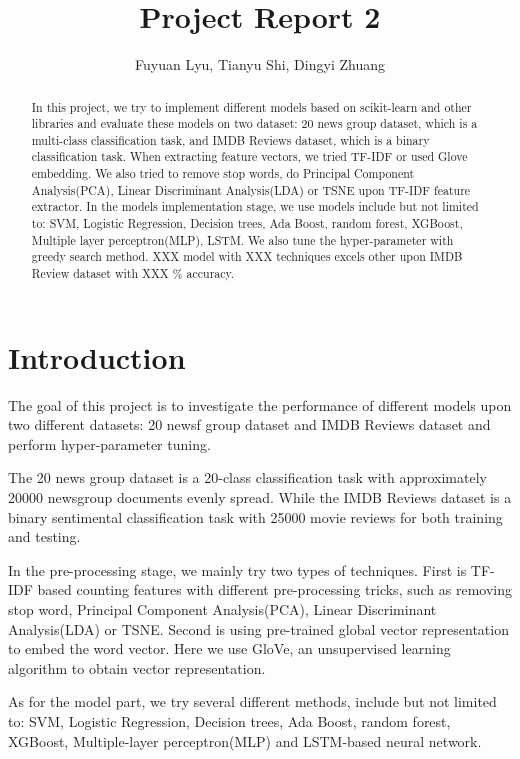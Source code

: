 \documentclass[11pt]{scrartcl}
\title{Project Report 2}
\author{Fuyuan Lyu, Tianyu Shi, Dingyi Zhuang}
\begin{document}
\maketitle

\begin{abstract}
In this project, we try to implement different models based on scikit-learn and other libraries and evaluate these models on two dataset: 20 news group dataset, which is a multi-class classification task, and IMDB Reviews dataset, which is a binary classification task. When extracting feature vectors, we tried TF-IDF or used Glove embedding. We also tried to remove stop words, do Principal Component Analysis(PCA), Linear Discriminant Analysis(LDA) or TSNE upon TF-IDF feature extractor. In the models implementation stage, we use models include but not limited to: SVM, Logistic Regression, Decision trees, Ada Boost, random forest, XGBoost, Multiple layer perceptron(MLP), LSTM. We also tune the hyper-parameter with greedy search method. XXX model with XXX techniques excels other upon IMDB Review dataset with XXX \% accuracy.
\end{abstract}

\section{Introduction}
The goal of this project is to investigate the performance of different models upon two different datasets: 20 newsf group dataset and IMDB Reviews dataset and perform hyper-parameter tuning.

The 20 news group dataset is a 20-class classification task with approximately 20000 newsgroup documents evenly spread\cite{Lang95}. While the IMDB Reviews dataset is a binary sentimental classification task with 25000 movie reviews for both training and testing\cite{maas-EtAl:2011:ACL-HLT2011}.

In the pre-processing stage, we mainly try two types of techniques. First is TF-IDF based counting features with different pre-processing tricks, such as removing stop word, Principal Component Analysis(PCA), Linear Discriminant Analysis(LDA) or TSNE. Second is using pre-trained global vector representation to embed the word vector. Here we use GloVe, an unsupervised learning algorithm to obtain vector representation\cite{pennington2014glove}.

As for the model part, we try several different methods, include but not limited to: SVM, Logistic Regression, Decision trees, Ada Boost, random forest, XGBoost, Multiple-layer perceptron(MLP) and LSTM-based neural network.
\end{document}
